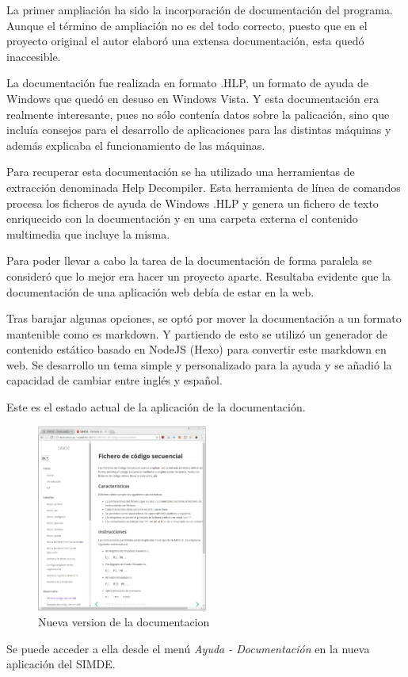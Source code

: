 
La primer ampliación ha sido la incorporación de documentación del programa. Aunque el
término de ampliación no es del todo correcto, puesto que en el proyecto original el autor
elaboró una extensa documentación, esta quedó inaccesible.

\bigskip
La documentación fue realizada en formato .HLP, un formato de ayuda de Windows que quedó
en desuso en Windows Vista. Y esta documentación era realmente interesante, pues no sólo
contenía datos sobre la palicación, sino que incluía consejos para el desarrollo de 
aplicaciones para las distintas máquinas y además explicaba el funcionamiento de las máquinas.

\bigskip
Para recuperar esta documentación se ha utilizado una herramientas de extracción denominada
Help Decompiler. Esta herramienta de línea de comandos procesa los ficheros de ayuda de
Windows .HLP y genera un fichero de texto enriquecido con la documentación y en una carpeta
externa el contenido multimedia que incluye la misma.

\bigskip
Para poder llevar a cabo la tarea de la documentación de forma paralela se consideró que lo mejor era
hacer un proyecto aparte. Resultaba evidente que la documentación de una aplicación web debía de estar en la
web. 

\bigskip
Tras barajar algunas opciones, se optó por mover la documentación a un formato mantenible como 
es markdown. Y partiendo de esto se utilizó un generador de contenido estático basado en NodeJS (Hexo)
para convertir este markdown en web. Se desarrollo un tema simple y personalizado para la ayuda y se 
añadió la capacidad de cambiar entre inglés y español.

\bigskip
Este es el estado actual de la aplicación de la documentación.

\begin{figure}[!th]
\begin{center}
\includegraphics[width=0.5\textwidth]{images/cap5/nueva-documentacion.eps}
\caption{Nueva version de la documentacion}
\label{fig:Nueva version de la documentacion}
\end{center}
\end{figure}

\bigskip
Se puede acceder a ella desde el menú \textit{Ayuda - Documentación} en la nueva aplicación del SIMDE.